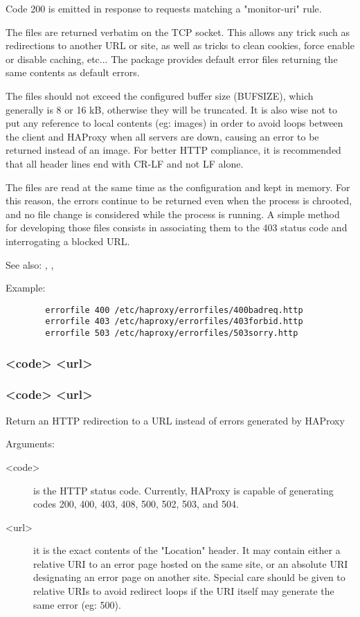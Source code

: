   Code 200 is emitted in response to requests matching a "monitor-uri" rule.

  The files are returned verbatim on the TCP socket. This allows any trick such
  as redirections to another URL or site, as well as tricks to clean cookies,
  force enable or disable caching, etc... The package provides default error
  files returning the same contents as default errors.

  The files should not exceed the configured buffer size (BUFSIZE), which
  generally is 8 or 16 kB, otherwise they will be truncated. It is also wise
  not to put any reference to local contents (eg: images) in order to avoid
  loops between the client and HAProxy when all servers are down, causing an
  error to be returned instead of an image. For better HTTP compliance, it is
  recommended that all header lines end with CR-LF and not LF alone.

  The files are read at the same time as the configuration and kept in memory.
  For this reason, the errors continue to be returned even when the process is
  chrooted, and no file change is considered while the process is running. A
  simple method for developing those files consists in associating them to the
  403 status code and interrogating a blocked URL.

  See also: , , 

  Example:
  \begin{verbatim}
        errorfile 400 /etc/haproxy/errorfiles/400badreq.http
        errorfile 403 /etc/haproxy/errorfiles/403forbid.http
        errorfile 503 /etc/haproxy/errorfiles/503sorry.http
  \end{verbatim}

\subsubsection[errorloc]{ <code> <url>}
\subsubsection[errorloc302]{ <code> <url>}

  Return an HTTP redirection to a URL instead of errors generated by HAProxy
  
  
  Arguments:
  \begin{description}
  \item[<code>]    is the HTTP status code. Currently, HAProxy is capable of
              generating codes 200, 400, 403, 408, 500, 502, 503, and 504.

  \item[<url>]     it is the exact contents of the "Location" header. It may contain
              either a relative URI to an error page hosted on the same site,
              or an absolute URI designating an error page on another site.
              Special care should be given to relative URIs to avoid redirect
              loops if the URI itself may generate the same error (eg: 500).
  \end{description}

